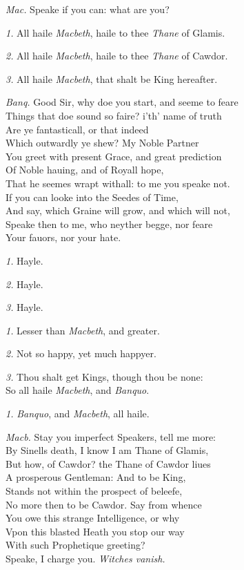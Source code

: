 \documentclass[12pt]{sides}
\newcommand{\dia}[1]{\hskip 15pt\textit{#1}\hskip 6pt}
\begin{document}
\begin{multicols}{2}
            \dia{Mac.} Speake if you can: what are you?
            
            \dia{1.} All haile \textit{Macbeth}, haile to thee \textit{Thane} of Glamis.
            
            \dia{2.} All haile \textit{Macbeth}, haile to thee \textit{Thane} of Cawdor.

            \dia{3.} All haile \textit{Macbeth}, that shalt be King hereafter.

            \dia{Banq.} Good Sir, why doe you start, and seeme to feare \\ Things that doe sound so faire? i'th' name of truth \\ Are ye fantasticall, or that indeed \\ Which outwardly ye shew? My Noble Partner \\ You greet with present Grace, and great prediction \\ Of Noble hauing, and of Royall hope, \\ That he seemes wrapt withall: to me you speake not. \\ If you can looke into the Seedes of Time, \\ And say, which Graine will grow, and which will not, \\ Speake then to me, who neyther begge, nor feare \\ Your fauors, nor your hate.

            \dia{1.} Hayle.
            
            \dia{2.} Hayle.
            
            \dia{3.} Hayle.

            \dia{1.} Lesser than \textit{Macbeth}, and greater.

            \dia{2.} Not so happy, yet much happyer.

            \dia{3.} Thou shalt get Kings, though thou be none: \\ So all haile \textit{Macbeth}, and \textit{Banquo}.

            \dia{1.} \textit{Banquo}, and \textit{Macbeth}, all haile.

            \dia{Macb.} Stay you imperfect Speakers, tell me more: \\ By Sinells death, I know I am Thane of Glamis, \\ But how, of Cawdor? the Thane of Cawdor liues \\ A prosperous Gentleman: And to be King, \\ Stands not within the prospect of beleefe, \\ No more then to be Cawdor. Say from whence \\ You owe this strange Intelligence, or why \\ Vpon this blasted Heath you stop our way \\ With such Prophetique greeting? \\ Speake, I charge you. \hfill \textit{Witches vanish.}


\end{multicols}
\end{document}
